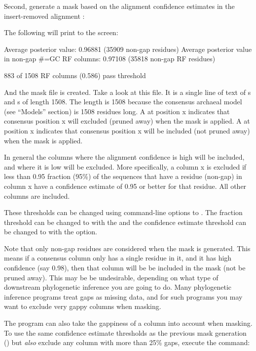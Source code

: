 Second, generate a mask based on the alignment confidence estimates
in the insert-removed alignment :


The following will print to the screen:

\begin{sreoutput}
Average posterior value:                            0.96881 (35909 non-gap residues)
Average posterior value in non-gap #=GC RF columns: 0.97108 (35818 non-gap RF residues)


883 of 1508 RF columns (0.586) pass threshold
\end{sreoutput}

And the mask file  is created. Take a look at this
file. It is a single line of text of s and s of length
1508. The length is 1508 because the consensus archaeal model (see
``Models'' section) is 1508 residues long. A  at position x
indicates that consensus position x will excluded (pruned away) when the mask
is applied. A  at position x indicates that consensus position
x will be included (not pruned away) when the mask is applied. 

In general the columns where the alignment confidence is high will be
included, and where it is low will be excluded. More specifically, a
column x is excluded if less than 0.95 fraction (95\%) of the sequences that
have a residue (non-gap) in column x have a confidence estimate of
0.95 or better for that residue. All other columns are included.

These thresholds can be changed using command-line options to 
. The fraction threshold can be changed to
 with the  and the confidence estimate
threshold can be changed to  with the 
option.

Note that only non-gap residues are considered when the mask is
generated. This means if a consensus column only has a single residue
in it, and it has high confidence (say 0.98), then that column will be
be included in the mask (not be pruned away). This may be be
undesirable, depending on what type of downstream phylogenetic inference
you are going to do. Many phylogenetic inference programs treat gaps
as missing data, and for such programs you may want to exclude very gappy
columns when masking. 

The  program can also take the gappiness of a
column into account when masking. To use the same confidence estimate
thresholds as the previous  mask generation
() but \emph{also} exclude any column 
with more than 25\% gaps, execute the command:

